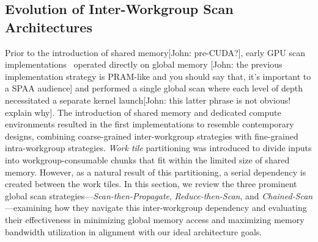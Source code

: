 \documentclass[sigconf]{acmart}
\newcommand{\john}[1]{{\footnotesize\color{cyan}[John: #1]}}
\begin{document}
\subsection{Evolution of Inter-Workgroup Scan Architectures}
Prior to the introduction of shared memory\john{pre-CUDA?}, early GPU scan implementations~\cite{Horn, Hensley, Greß, Sengupta} operated directly on global memory \john{the previous implementation strategy is PRAM-like and you should say that, it's important to a SPAA audience} and performed a single global scan where each level of depth necessitated a separate kernel launch\john{this latter phrase is not obvious! explain why}. The introduction of shared memory and dedicated compute environments resulted in the first implementations to resemble contemporary designs, combining coarse-grained inter-workgroup strategies with fine-grained intra-workgroup strategies. \emph{Work tile} partitioning was introduced to divide inputs into workgroup-consumable chunks that fit within the limited size of shared memory. However, as a natural result of this partitioning, a serial dependency is created between the work tiles. In this section, we review the three prominent global scan strategies—\emph{Scan-then-Propagate}, \emph{Reduce-then-Scan}, and \emph{Chained-Scan}—examining how they navigate this inter-workgroup dependency and evaluating their effectiveness in minimizing global memory access and maximizing memory bandwidth utilization in alignment with our ideal architecture goals.
\end{document}
